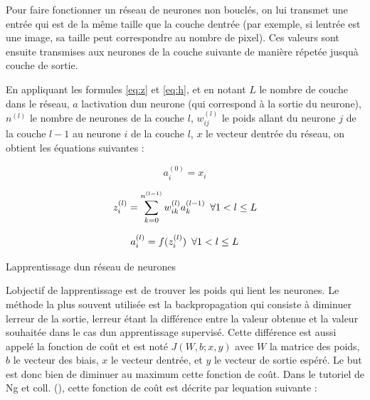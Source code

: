 \documentclass[11pt,final,ENIB]{sdm}
\begin{document}
			Pour faire fonctionner un r\'eseau de neurones non boucl\'es, on lui transmet une entr\'ee qui est de la m\^eme taille que la couche d\textquotesingle entr\'ee (par exemple, si l\textquotesingle entr\'ee est une image, sa taille peut correspondre au nombre de pixel). Ces valeurs sont ensuite transmises aux neurones de la couche suivante de mani\`ere r\'epet\'ee jusqu\textquotesingle \`a couche de sortie.

			En appliquant les formules \ref{eq:z} et \ref{eq:h}, et en notant $L$ le nombre de couche dans le r\'eseau, $a$ l\textquotesingle activation d\textquotesingle un neurone (qui correspond \`a la sortie du neurone), $n^{(l)}$ le nombre de neurones de la couche $l$, $w_{ij}^{(l)}$ le poids allant du neurone $j$ de la couche $l-1$ au neurone $i$ de la couche $l$, $x$ le vecteur d\textquotesingle entr\'ee du r\'eseau, on obtient les \'equations suivantes :

			\begin{equation}
				a_i^{(0)} = x_i
				\label{eq:input}
			\end{equation}

			\begin{equation}
				z_i^{(l)} = \sum_{k=0}^{n^{(l-1)}} w_{ik}^{(l)} a_k^{(l-1)} \enskip \forall 1 < l \leq L
				\label{eq:zGlobal}
			\end{equation}

			\begin{equation}
				a_i^{(l)} = f(z_i^{(l)}) \enskip \forall 1 < l \leq L
				\label{eq:activation}
			\end{equation}

			\medbreak
			\begin{itshape}L\textquotesingle apprentissage d\textquotesingle un r\'eseau de neurones\end{itshape}

			L\textquotesingle objectif de l\textquotesingle apprentissage est de trouver les poids qui lient les neurones. Le m\'ethode la plus souvent utilis\'ee est la backpropagation qui consiste \`a diminuer l\textquotesingle erreur de la sortie, l\textquotesingle erreur \'etant la diff\'erence entre la valeur obtenue et la valeur souhait\'ee dans le cas d\textquotesingle un apprentissage supervis\'e. Cette diff\'erence est aussi appel\'e la fonction de co\^ut et est not\'e $J(W,b;x,y)$ avec $W$ la matrice des poids, $b$ le vecteur des biais, $x$ le vecteur d\textquotesingle entr\'ee, et $y$ le vecteur de sortie esp\'er\'e. Le but est donc bien de diminuer au maximum cette fonction de co\^ut. Dans le tutoriel de Ng et coll. (\cite{ng2012ufldl}), cette fonction de co\^ut est d\'ecrite par l\textquotesingle equation suivante :
\end{document}
